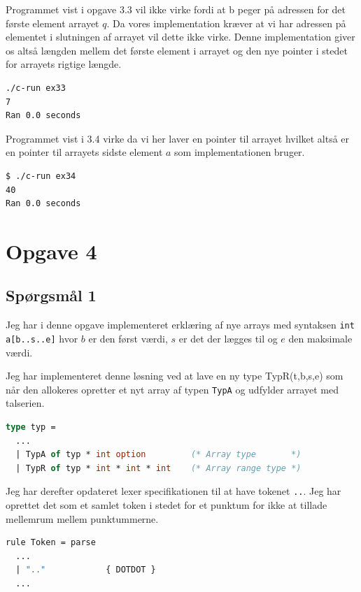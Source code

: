 \documentclass[danish,a4paper]{report}
\begin{document}
Programmet vist i opgave 3.3 vil ikke virke fordi at b peger på adressen for det første element arrayet $q$. Da vores implementation kræver at vi har adressen på elementet i slutningen af arrayet vil dette ikke virke. Denne implementation giver os altså længden mellem det første element i arrayet og den nye pointer i stedet for arrayets rigtige længde.


\begin{lstlisting}[language=bash]
./c-run ex33
7
Ran 0.0 seconds

\end{lstlisting}

Programmet vist i 3.4 virke da vi her laver en pointer til arrayet hvilket altså er en pointer til arrayets sidste element $a$ som implementationen bruger.

\begin{lstlisting}[language=bash]
$ ./c-run ex34
40
Ran 0.0 seconds
\end{lstlisting}

\chapter*{Opgave 4}
\section*{Spørgsmål 1}

Jeg har i denne opgave implementeret erklæring af nye arrays med syntaksen \texttt{int a[b..s..e]} hvor $b$ er den først værdi, $s$ er det der lægges til og $e$ den maksimale værdi.

Jeg har implementeret denne løsning ved at lave en ny type TypR(t,b,s,e) som når den allokeres opretter et nyt array af typen \texttt{TypA} og udfylder arrayet med talserien.



  \begin{lstlisting}[language=ML]
type typ =
  ...
  | TypA of typ * int option         (* Array type       *)
  | TypR of typ * int * int * int    (* Array range type *)
\end{lstlisting}

Jeg har derefter opdateret lexer specifikationen til at have tokenet \texttt{..}. Jeg har oprettet det som et samlet token i stedet for et punktum for ikke at tillade mellemrum mellem punktummerne.

\begin{lstlisting}[language=ML]
rule Token = parse
  ...
  | ".."            { DOTDOT }
  ...
\end{lstlisting}
\end{document}
